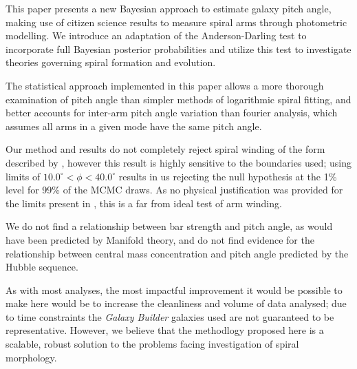 This paper presents a new Bayesian approach to estimate galaxy pitch angle, making use of citizen science results to measure spiral arms through photometric modelling. We introduce an adaptation of the Anderson-Darling test to incorporate full Bayesian posterior probabilities and utilize this test to investigate theories governing spiral formation and evolution.

The statistical approach implemented in this paper allows a more thorough examination of pitch angle than simpler methods of logarithmic spiral fitting, and better accounts for inter-arm pitch angle variation than fourier analysis, which assumes all arms in a given mode have the same pitch angle.

Our method and results do not completely reject spiral winding of the form described by \citet{2019arXiv190910291P}, however this result is highly sensitive to the boundaries used; using limits of $10.0^\circ < \phi < 40.0^\circ$ results in us rejecting the null hypothesis at the 1\% level for 99\% of the MCMC draws. As no physical justification was provided for the limits present in \citet{2019arXiv190910291P}, this is a far from ideal test of arm winding.

We do not find a relationship between bar strength and pitch angle, as would have been predicted by Manifold theory, and do not find evidence for the relationship between central mass concentration and pitch angle predicted by the Hubble sequence.

As with most analyses, the most impactful improvement it would be possible to make here would be to increase the cleanliness and volume of data analysed; due to time constraints the \textit{Galaxy Builder} galaxies used are not guaranteed to be representative. However, we believe that the methodlogy proposed here is a scalable, robust solution to the problems facing investigation of spiral morphology.
